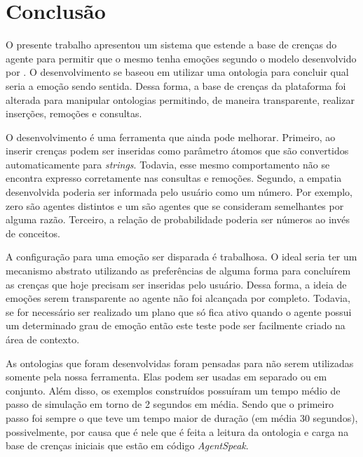\chapter{Conclusão} \label{ch:cf}


O presente trabalho apresentou um sistema que estende a base de
crenças do agente \jason para permitir que o mesmo tenha emoções segundo o
modelo desenvolvido por \citet{ortony1988cse}. O desenvolvimento se baseou em
utilizar uma ontologia para concluir qual seria a emoção sendo sentida. Dessa
forma, a base de crenças da plataforma foi alterada para manipular ontologias
permitindo, de maneira transparente, realizar inserções, remoções e consultas.

O desenvolvimento é uma ferramenta que ainda pode melhorar.
Primeiro, ao inserir crenças podem ser inseridas como parâmetro
átomos que são convertidos automaticamente para \emph{strings}. Todavia, esse
mesmo comportamento não se encontra expresso corretamente nas consultas e
remoções. Segundo, a empatia desenvolvida poderia ser informada pelo usuário
como um número. Por exemplo, zero são agentes distintos e um são agentes que
se consideram semelhantes por alguma razão. Terceiro, a relação de
probabilidade poderia ser números ao invés de conceitos.

A configuração para uma emoção ser disparada é trabalhosa. O
ideal seria ter um mecanismo abstrato utilizando as preferências de alguma
forma para concluírem as crenças que hoje precisam ser inseridas pelo usuário.
Dessa forma, a ideia de emoções serem transparente ao agente não foi
alcançada por completo. Todavia, se for necessário ser realizado um plano que só fica
ativo quando o agente possui um determinado grau de emoção então este teste
pode ser facilmente criado na área de contexto.


As ontologias que foram desenvolvidas foram pensadas para não serem utilizadas
somente pela nossa ferramenta. Elas podem ser usadas em separado ou em conjunto.
Além disso, os exemplos construídos possuíram um tempo médio de passo de
simulação em torno de 2 segundos em média. Sendo que o primeiro passo foi sempre o
que teve um tempo maior de duração (em média 30 segundos), possivelmente, por
causa que é nele que é feita a leitura da ontologia e carga na base de crenças
iniciais que estão em código \emph{AgentSpeak}.

